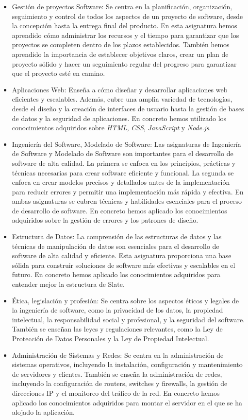\begin{itemize}
    \item Gestión de proyectos Software: Se centra en la planificación, organización, seguimiento y control de todos los aspectos de un proyecto de software, desde la concepción hasta la entrega final del producto. En esta asignatura hemos aprendido cómo administrar los recursos y el tiempo para garantizar que los proyectos se completen dentro de los plazos establecidos. También hemos aprendido la importancia de establecer objetivos claros, crear un plan de proyecto sólido y hacer un seguimiento regular del progreso para garantizar que el proyecto esté en camino.
    \item Aplicaciones Web: Enseña a cómo diseñar y desarrollar aplicaciones web eficientes y escalables. Además, cubre una amplia variedad de tecnologías, desde el diseño y la creación de interfaces de usuario hasta la gestión de bases de datos y la seguridad de aplicaciones. En concreto hemos utilizado los conocimientos adquiridos sobre \textit{HTML}, \textit{CSS}, \textit{JavaScript} y \textit{Node.js}.
    \item Ingeniería del Software, Modelado de Software: Las asignaturas de Ingeniería de Software y Modelado de Software son importantes para el desarrollo de software de alta calidad. La primera se enfoca en los principios, prácticas y técnicas necesarias para crear software eficiente y funcional. La segunda se enfoca en crear modelos precisos y detallados antes de la implementación para reducir errores y permitir una implementación más rápida y efectiva. En ambas asignaturas se cubren técnicas y habilidades esenciales para el proceso de desarrollo de software. En concreto hemos aplicado los conocimientos adquiridos sobre la gestión de errores y los patrones de diseño.
    \item Estructura de Datos: La comprensión de las estructuras de datos y las técnicas de manipulación de datos son esenciales para el desarrollo de software de alta calidad y eficiente. Esta asignatura proporciona una base sólida para construir soluciones de software más efectivas y escalables en el futuro. En concreto hemos aplicado los conocimientos adquiridos para entender mejor la estructura de Slate.
    \item Ética, legislación y profesión: Se centra sobre los aspectos éticos y legales de la ingeniería de software, como la privacidad de los datos, la propiedad intelectual, la responsabilidad social y profesional, y la seguridad del software. También se enseñan las leyes y regulaciones relevantes, como la Ley de Protección de Datos Personales y la Ley de Propiedad Intelectual.
    \item Administración de Sistemas y Redes: Se centra en la administración de sistemas operativos, incluyendo la instalación, configuración y mantenimiento de servidores y clientes. También se enseña la administración de redes, incluyendo la configuración de routers, switches y firewalls, la gestión de direcciones IP y el monitoreo del tráfico de la red. En concreto hemos aplicado los conocimientos adquiridos para montar el servidor en el que se ha alojado la aplicación.
\end{itemize}

